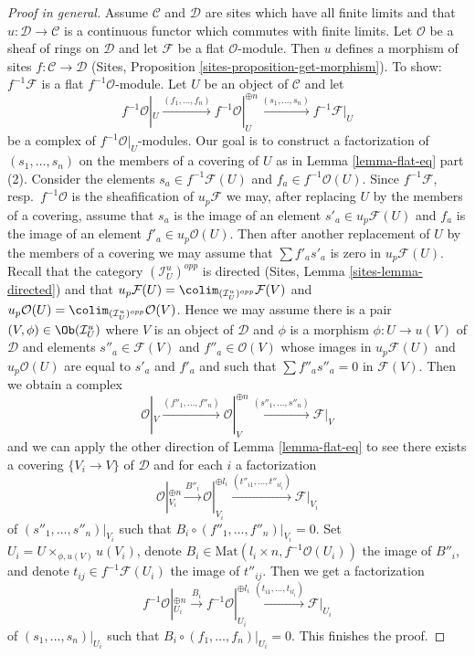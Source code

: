 \begin{proof}[Proof in general]
\medskip\noindent
Assume $\mathcal{C}$ and $\mathcal{D}$ are sites which
have all finite limits and that $u : \mathcal{D} \to \mathcal{C}$
is a continuous functor which commutes with finite limits.
Let $\mathcal{O}$ be a sheaf of rings on $\mathcal{D}$
and let $\mathcal{F}$ be a flat $\mathcal{O}$-module.
Then $u$ defines a morphism of sites $f : \mathcal{C} \to \mathcal{D}$
(Sites, Proposition \ref{sites-proposition-get-morphism}).
To show: $f^{-1}\mathcal{F}$ is a flat $f^{-1}\mathcal{O}$-module.
Let $U$ be an object of $\mathcal{C}$ and let
$$
f^{-1}\mathcal{O}|_U \xrightarrow{(f_1, \ldots, f_n)}
f^{-1}\mathcal{O}|_U^{\oplus n} \xrightarrow{(s_1, \ldots, s_n)}
f^{-1}\mathcal{F}|_U
$$
be a complex of $f^{-1}\mathcal{O}|_U$-modules.
Our goal is to construct a factorization of
$(s_1, \ldots, s_n)$ on the members of a covering of $U$
as in Lemma \ref{lemma-flat-eq} part (2).
Consider the elements $s_a \in f^{-1}\mathcal{F}(U)$
and $f_a \in f^{-1}\mathcal{O}(U)$.
Since $f^{-1}\mathcal{F}$, resp.\ $f^{-1}\mathcal{O}$
is the sheafification of $u_p\mathcal{F}$ we may,
after replacing $U$ by the members of a covering,
assume that $s_a$ is the image of an element $s'_a \in u_p\mathcal{F}(U)$ and
$f_a$ is the image of an element $f'_a \in u_p\mathcal{O}(U)$.
Then after another replacement of $U$ by the members of a covering
we may assume that $\sum f'_as'_a$ is zero in $u_p\mathcal{F}(U)$.
Recall that the category $(\mathcal{I}_U^u)^{opp}$ is directed
(Sites, Lemma \ref{sites-lemma-directed})
and that $u_p\mathcal{F}(U) = \colim_{(\mathcal{I}_U^u)^{opp}} \mathcal{F}(V)$
and $u_p\mathcal{O}(U) = \colim_{(\mathcal{I}_U^u)^{opp}} \mathcal{O}(V)$.
Hence we may assume there is a pair $(V, \phi) \in \Ob(\mathcal{I}_U^u)$
where $V$ is an object of $\mathcal{D}$
and $\phi$ is a morphism $\phi : U \to u(V)$ of $\mathcal{D}$
and elements $s''_a \in \mathcal{F}(V)$ and $f''_a \in \mathcal{O}(V)$
whose images in $u_p\mathcal{F}(U)$ and $u_p\mathcal{O}(U)$
are equal to $s'_a$ and $f'_a$ and such that
$\sum f''_a s''_a = 0$ in $\mathcal{F}(V)$.
Then we obtain a complex
$$
\mathcal{O}|_V \xrightarrow{(f''_1, \ldots, f''_n)}
\mathcal{O}|_V^{\oplus n} \xrightarrow{(s''_1, \ldots, s''_n)}
\mathcal{F}|_V
$$
and we can apply the other direction of Lemma \ref{lemma-flat-eq}
to see there exists a covering $\{V_i \to V\}$ of $\mathcal{D}$
and for each $i$ a factorization
$$
\mathcal{O}|_{V_i}^{\oplus n}
\xrightarrow{B''_i}
\mathcal{O}|_{V_i}^{\oplus l_i} \xrightarrow{(t''_{i1}, \ldots, t''_{il_i})}
\mathcal{F}|_{V_i}
$$
of $(s''_1, \ldots, s''_n)|_{V_i}$ such that
$B_i \circ (f''_1, \ldots, f''_n)|_{V_i} = 0$.
Set $U_i = U \times_{\phi, u(V)} u(V_i)$, denote
$B_i \in \text{Mat}(l_i \times n, f^{-1}\mathcal{O}(U_i))$
the image of $B''_i$, and denote
$t_{ij} \in f^{-1}\mathcal{F}(U_i)$ the image of
$t''_{ij}$. Then we get a factorization
$$
f^{-1}\mathcal{O}|_{U_i}^{\oplus n}
\xrightarrow{B_i}
f^{-1}\mathcal{O}|_{U_i}^{\oplus l_i}
\xrightarrow{(t_{i1}, \ldots, t_{il_i})}
\mathcal{F}|_{U_i}
$$
of $(s_1, \ldots, s_n)|_{U_i}$ such that
$B_i \circ (f_1, \ldots, f_n)|_{U_i} = 0$.
This finishes the proof.
\end{proof}






